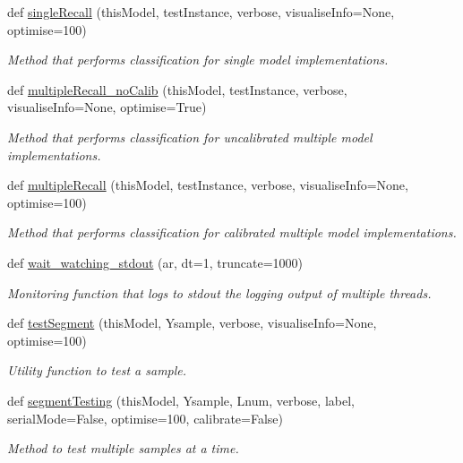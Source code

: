 \begin{DoxyCompactItemize}
def \hyperlink{group__icubclient__SAM__Tests_ga08baf53ab45bde447965b03d0bfa1a35}{single\+Recall} (this\+Model, test\+Instance, verbose, visualise\+Info=None, optimise=100)
\begin{DoxyCompactList}\small\item\em Method that performs classification for single model implementations. \end{DoxyCompactList}\item 
def \hyperlink{group__icubclient__SAM__Tests_gae7639430f294ed485cb2ea03a9bb5095}{multiple\+Recall\+\_\+no\+Calib} (this\+Model, test\+Instance, verbose, visualise\+Info=None, optimise=True)
\begin{DoxyCompactList}\small\item\em Method that performs classification for uncalibrated multiple model implementations. \end{DoxyCompactList}\item 
def \hyperlink{group__icubclient__SAM__Tests_ga684e61ac3df13fa4ae0d20ed03a9979f}{multiple\+Recall} (this\+Model, test\+Instance, verbose, visualise\+Info=None, optimise=100)
\begin{DoxyCompactList}\small\item\em Method that performs classification for calibrated multiple model implementations. \end{DoxyCompactList}\item 
def \hyperlink{group__icubclient__SAM__Tests_gaa209fbf7add0cf59bd93a76f0387d343}{wait\+\_\+watching\+\_\+stdout} (ar, dt=1, truncate=1000)
\begin{DoxyCompactList}\small\item\em Monitoring function that logs to stdout the logging output of multiple threads. \end{DoxyCompactList}\item 
def \hyperlink{group__icubclient__SAM__Tests_gaa5357ad5f4775cd411d35896655374f5}{test\+Segment} (this\+Model, Ysample, verbose, visualise\+Info=None, optimise=100)
\begin{DoxyCompactList}\small\item\em Utility function to test a sample. \end{DoxyCompactList}\item 
def \hyperlink{group__icubclient__SAM__Tests_ga3a78ca830aeec689bb106d1af35c2411}{segment\+Testing} (this\+Model, Ysample, Lnum, verbose, label, serial\+Mode=False, optimise=100, calibrate=False)
\begin{DoxyCompactList}\small\item\em Method to test multiple samples at a time. \end{DoxyCompactList}\item 

\end{DoxyCompactItemize}
